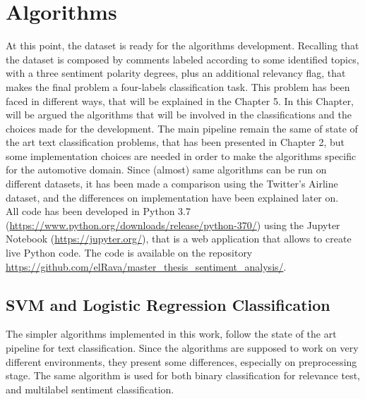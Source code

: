 
\chapter{Algorithms}

At this point, the dataset is ready for the algorithms development. Recalling that the dataset is composed by comments labeled according to some identified topics, with a three sentiment polarity degrees, plus an additional relevancy flag, that makes the final problem a four-labels classification task. This problem has been faced in different ways, that will be explained in the Chapter 5. In this Chapter, will be argued the algorithms that will be involved in the classifications and the choices made for the development. The main pipeline remain the same of state of the art text classification problems, that has been presented in Chapter 2, but some implementation choices are needed in order to make the algorithms specific for the automotive domain. Since (almost) same algorithms can be run on different datasets, it has been made a comparison using the Twitter's Airline dataset, and the differences on implementation have been explained later on.\\
All code has been developed in Python 3.7 (\url{https://www.python.org/downloads/release/python-370/}) using the Jupyter Notebook (\url{https://jupyter.org/}), that is a web application that allows to create live Python code. 
The code is available on the repository \url{https://github.com/elRava/master_thesis_sentiment_analysis/}.


\section{SVM and Logistic Regression Classification}

The simpler algorithms implemented in this work, follow the state of the art pipeline for text classification. Since the algorithms are supposed to work on very different environments, they present some differences, especially on preprocessing stage. The same algorithm is used for both binary classification for relevance test, and multilabel sentiment classification.\\


